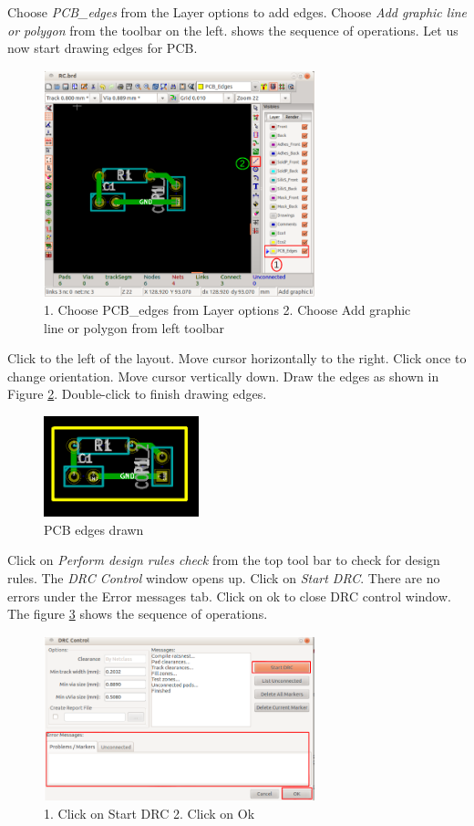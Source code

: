 Choose \textit{PCB\_edges} from the Layer options to add edges. Choose \textit{Add graphic line or polygon} from the toolbar on the left.  shows the sequence of operations. Let us now start drawing edges for PCB.
\begin{figure}
\centering
\includegraphics[width=0.7\textwidth]{figures/pcbedges}
\caption{1. Choose PCB\_edges from Layer options 2. Choose Add graphic line or polygon from left toolbar}
\label{pcbedges}
\end{figure}
Click to the left of the layout. Move cursor horizontally to the right. Click once to change orientation. Move cursor vertically down. Draw  the edges as shown in Figure \ref{pcbed}. Double-click to finish drawing edges.
\begin{figure}
\centering
\includegraphics[width=0.4\textwidth]{figures/pcbed}
\caption{PCB edges drawn}
\label{pcbed}
\end{figure}

Click on \textit{Perform design rules check} from the top tool bar to check for design rules. The \textit{DRC Control} window opens up. Click on \textit{Start DRC}. There are no errors under the Error messages tab. Click on ok to close DRC control window. The figure \ref{drc} shows the sequence of operations.
\begin{figure}
\centering
\includegraphics[width=0.7\textwidth]{figures/drc}
\caption{1. Click on Start DRC 2. Click on Ok}
\label{drc}
\end{figure}

